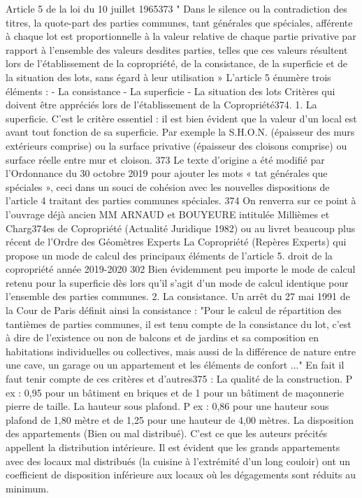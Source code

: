 		Article 5 de la loi du 10 juillet 1965373
		" Dans le silence ou la contradiction des titres, la quote-part des parties communes, tant générales que spéciales, afférente à chaque lot est proportionnelle à la valeur relative de chaque partie privative par rapport à l'ensemble des valeurs desdites parties, telles que ces valeurs résultent lors de l'établissement de la copropriété, de la consistance, de la superficie et de la situation des lots, sans égard à leur utilisation »
		L'article 5 énumère trois éléments :
		- La consistance
		- La superficie
		- La situation des lots
		Critères qui doivent être appréciés lors de l'établissement de la Copropriété374.
		1. La superficie.
		C'est le critère essentiel : il est bien évident que la valeur d'un local est avant tout fonction de sa superficie.
		Par exemple la S.H.O.N. (épaisseur des murs extérieurs comprise) ou la surface privative (épaisseur des cloisons comprise) ou surface réelle entre mur et cloison.
		373 Le texte d’origine a été modifié par l’Ordonnance du 30 octobre 2019 pour ajouter les mots « tat générales que spéciales », ceci dans un souci de cohésion avec les nouvelles dispositions de l’article 4 traitant des parties communes spéciales.
		374 On renverra sur ce point à l’ouvrage déjà ancien MM ARNAUD et BOUYEURE intitulée Millièmes et Charg374es de Copropriété (Actualité Juridique 1982) ou au livret beaucoup plus récent de l’Ordre des Géomètres Experts La Copropriété (Repères Experts) qui propose un mode de calcul des principaux éléments de l’article 5.
		droit de la copropriété année 2019-2020
		302
		Bien évidemment peu importe le mode de calcul retenu pour la superficie dès lors qu’il s’agit d’un mode de calcul identique pour l’ensemble des parties communes.
		2. La consistance.
		Un arrêt du 27 mai 1991 de la Cour de Paris définit ainsi la consistance :
		"Pour le calcul de répartition des tantièmes de parties communes, il est tenu compte de la consistance du lot, c'est à dire de l'existence ou non de balcons et de jardins et sa composition en habitations individuelles ou collectives, mais aussi de la différence de nature entre une cave, un garage ou un appartement et les éléments de confort ..."
		En fait il faut tenir compte de ces critères et d'autres375 :
		La qualité de la construction.
		P ex : 0,95 pour un bâtiment en briques et de 1 pour un bâtiment de maçonnerie pierre de taille.
		La hauteur sous plafond.
		P ex : 0,86 pour une hauteur sous plafond de 1,80 mètre et de 1,25 pour une hauteur de 4,00 mètres.
		La disposition des appartements (Bien ou mal distribué).
		C'est ce que les auteurs précités appellent la distribution intérieure. Il est évident que les grands appartements avec des locaux mal distribués (la cuisine à l'extrémité d'un long couloir) ont un coefficient de disposition inférieure aux locaux où les dégagements sont réduits au minimum.
